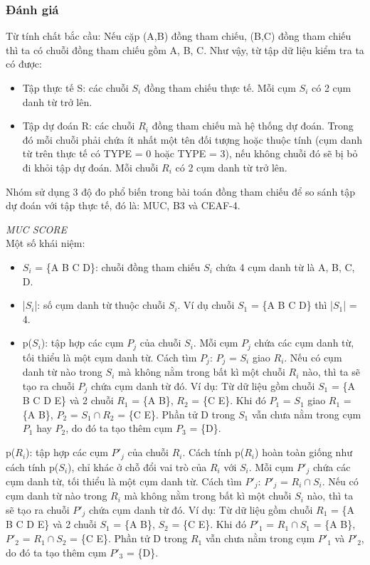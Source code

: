 \documentclass[12pt]{extarticle}
\begin{document}
			\subsubsection*{Đánh giá}
				\par Từ tính chất bắc cầu: Nếu cặp (A,B) đồng tham chiếu, (B,C) đồng  tham chiếu thì ta có chuỗi đồng tham chiếu gồm A, B, C. Như vậy, từ tập dữ liệu kiểm tra ta có được:
					\begin{itemize}
				 		\item{Tập thực tế S: các chuỗi $S_i$ đồng tham chiếu thực tế. Mỗi cụm $S_i$ có 2 cụm danh từ trở lên.}				
						\item{Tập dự đoán R: các chuỗi $R_i$ đồng tham chiếu mà hệ thống dự đoán. Trong đó mỗi chuỗi phải chứa ít nhất một tên đối tượng hoặc thuộc tính (cụm danh từ trên thực tế có TYPE = 0 hoặc TYPE = 3), nếu không chuỗi đó sẽ bị bỏ đi khỏi tập dự đoán. Mỗi chuỗi $R_i$ có 2 cụm danh từ trở lên.}
					\end{itemize}
				\par Nhóm sử dụng 3 độ đo phổ biến trong bài toán đồng tham chiếu để so sánh tập dự đoán với tập thực tế, đó là: MUC, B3 và CEAF-4.
				\par \textit{MUC SCORE}
				\\Một số khái niệm:
					\begin{itemize}
						\item{$S_i$ = \{A B C D\}: chuỗi đồng tham chiếu $S_i$ chứa 4 cụm danh từ là A, B, C, D.}
						\item{|$S_i$|: số cụm danh từ thuộc chuỗi $S_i$. Ví dụ chuỗi $S_1$ = \{A B C D\} thì |$S_1$| = 4.}
						\item{p($S_i$): tập hợp các cụm $P_j$ của chuỗi $S_i$. Mỗi cụm $P_j$ chứa các cụm danh từ, tối thiểu là một cụm danh từ. Cách tìm $P_j$: $P_j$ = $S_i$ giao $R_i$. Nếu có cụm danh từ nào trong $S_i$ mà không nằm trong bất kì một chuỗi $R_i$ nào, thì ta sẽ tạo ra chuỗi $P_j$ chứa cụm danh từ đó. Ví dụ: Từ dữ liệu gồm chuỗi $S_1$ = \{A B C D E\} và 2 chuỗi $R_1$ = \{A B\}, $R_2$ = \{C E\}. Khi đó $P_1$ = $S_1$ giao $R_1$ = \{A B\}, $P_2$ = $S_1 \cap R_2$ = \{C E\}. Phần tử D trong $S_1$ vẫn chưa nằm trong cụm $P_1$ hay $P_2$, do đó ta tạo thêm cụm $P_3$ = \{D\}.}
					\end{itemize}								
				p($R_i$): tập hợp các cụm $P'_j$ của chuỗi $R_i$. Cách tính p($R_i$) hoàn toàn giống như cách tính p($S_i$), chỉ khác ở chỗ đổi vai trò của $R_i$ với $S_i$. Mỗi cụm $P'_j$ chứa các cụm danh từ, tối thiểu là một cụm danh từ. Cách tìm $P'_j$: $P'_j$ = $R_i \cap S_i$. Nếu có cụm danh từ nào trong $R_i$ mà không nằm trong bất kì một chuỗi $S_i$ nào, thì ta sẽ tạo ra chuỗi $P'_j$ chứa cụm danh từ đó. Ví dụ: Từ dữ liệu gồm chuỗi $R_1$ = \{A B C D E\} và 2  chuỗi $S_1$ = \{A B\}, $S_2$ = \{C E\}. Khi đó $P'_1$ = $R_1 \cap S_1$ = \{A B\}, $P'_2$ = $R_1 \cap S_2$ = \{C E\}. Phần tử D trong $R_1$ vẫn chưa nằm trong cụm $P'_1$ và $P'_2$, do đó ta tạo thêm cụm $P'_3$ = \{D\}.
\end{document}

